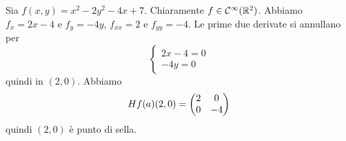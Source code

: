 \documentclass[a4paper]{article}
\begin{document}
\begin{radioactive}
\begin{snippetexample}{}
    Sia \(f(x,y) = x^2 - 2y^2 - 4x + 7\).
    Chiaramente \(f\in\mathcal{C}^\infty(\mathbb{R}^2)\).
    Abbiamo \(f_x = 2x-4\) e \(f_y=-4y\), \(f_{xx} = 2\) e \(f_{yy} = -4\).
    Le prime due derivate si annullano per
    \[
        \begin{cases}
            2x-4 = 0\\ -4y =0
        \end{cases}
    \]
    quindi in \((2,0)\).
    Abbiamo
    \[
        H f(a)(2,0) = \begin{pmatrix}
            2 & 0 \\ 0 & -4
        \end{pmatrix}
    \]
    quindi \((2,0)\) è punto di sella.
\end{snippetexample}


\end{radioactive}
\end{document}
